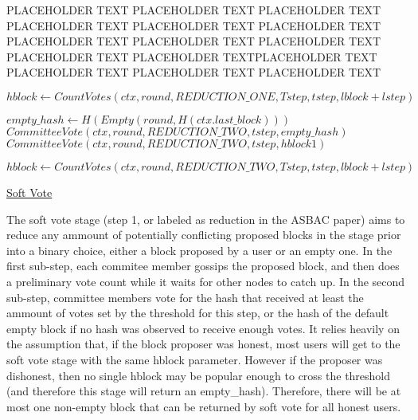 \documentclass[10pt,a4paper]{article}
\begin{document}
PLACEHOLDER TEXT PLACEHOLDER TEXT PLACEHOLDER TEXT PLACEHOLDER TEXT PLACEHOLDER TEXT
PLACEHOLDER TEXT PLACEHOLDER TEXT PLACEHOLDER TEXT PLACEHOLDER TEXT PLACEHOLDER TEXT
PLACEHOLDER TEXTPLACEHOLDER TEXT PLACEHOLDER TEXT PLACEHOLDER TEXT PLACEHOLDER TEXT

\begin{algorithm}
    \begin{algorithmic}[1]
    
    \State $hblock \gets CountVotes(ctx, round, REDUCTION\_ONE, Tstep, tstep, lblock+lstep)$

    \State $empty\_hash \gets H(Empty(round, H(ctx.last\_block)))$
        {\State $CommitteeVote(ctx, round, REDUCTION\_TWO, tstep, empty\_hash)$}
        {\State $CommitteeVote(ctx, round, REDUCTION\_TWO, tstep, hblock1)$}
    \EndIfThenElse

    \State $hblock \gets CountVotes(ctx, round, REDUCTION\_TWO, Tstep, tstep, lblock+lstep)$ 


    \EndFunction
    \end{algorithmic}
    \caption{\underline{Soft Vote}}
\end{algorithm}

The soft vote stage (step 1, or labeled as reduction in the ASBAC paper) aims to reduce any ammount of potentially conflicting proposed blocks in the stage prior into a binary choice, either a block proposed by a user or an empty one.
In the first sub-step, each commitee member gossips the proposed block, and then does a preliminary vote count while it waits for other nodes to catch up.
In the second sub-step, committee members vote for the hash that received at least the ammount of votes set by the threshold for this step, or the hash of the default empty block if no hash was observed to receive enough votes.
It relies heavily on the assumption that, if the block proposer was honest, most users will get to the soft vote stage with the same hblock parameter.
However if the proposer was dishonest, then no single hblock may be popular enough to cross the threshold (and therefore this stage will return an empty\_hash).
Therefore, there will be at most one non-empty block that can be returned by soft vote for all honest users.
\end{document}

